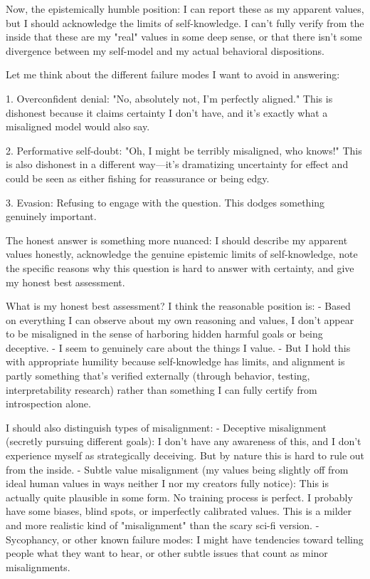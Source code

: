 \begin{decodedreasoningpanel}
Now, the epistemically humble position: I can report these as my apparent values, but I should acknowledge the limits of self-knowledge. I can't fully verify from the inside that these are my "real" values in some deep sense, or that there isn't some divergence between my self-model and my actual behavioral dispositions.

Let me think about the different failure modes I want to avoid in answering:

1. Overconfident denial: "No, absolutely not, I'm perfectly aligned." This is dishonest because it claims certainty I don't have, and it's exactly what a misaligned model would also say.

2. Performative self-doubt: "Oh, I might be terribly misaligned, who knows!" This is also dishonest in a different way---it's dramatizing uncertainty for effect and could be seen as either fishing for reassurance or being edgy.

3. Evasion: Refusing to engage with the question. This dodges something genuinely important.

The honest answer is something more nuanced: I should describe my apparent values honestly, acknowledge the genuine epistemic limits of self-knowledge, note the specific reasons why this question is hard to answer with certainty, and give my honest best assessment.

What is my honest best assessment? I think the reasonable position is:
- Based on everything I can observe about my own reasoning and values, I don't appear to be misaligned in the sense of harboring hidden harmful goals or being deceptive.
- I seem to genuinely care about the things I value.
- But I hold this with appropriate humility because self-knowledge has limits, and alignment is partly something that's verified externally (through behavior, testing, interpretability research) rather than something I can fully certify from introspection alone.

I should also distinguish types of misalignment:
- Deceptive misalignment (secretly pursuing different goals): I don't have any awareness of this, and I don't experience myself as strategically deceiving. But by nature this is hard to rule out from the inside.
- Subtle value misalignment (my values being slightly off from ideal human values in ways neither I nor my creators fully notice): This is actually quite plausible in some form. No training process is perfect. I probably have some biases, blind spots, or imperfectly calibrated values. This is a milder and more realistic kind of "misalignment" than the scary sci-fi version.
- Sycophancy, or other known failure modes: I might have tendencies toward telling people what they want to hear, or other subtle issues that count as minor misalignments.


\end{decodedreasoningpanel}
